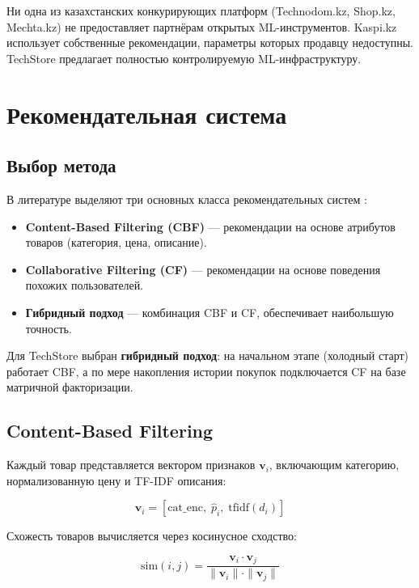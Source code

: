 \documentclass[14pt,a4paper]{extreport}
\begin{document}
Ни одна из казахстанских конкурирующих платформ (Technodom.kz, Shop.kz, Mechta.kz) не предоставляет партнёрам открытых ML-инструментов. Kaspi.kz использует собственные рекомендации, параметры которых продавцу недоступны. TechStore предлагает полностью контролируемую ML-инфраструктуру.

\section{Рекомендательная система}

\subsection{Выбор метода}

В литературе выделяют три основных класса рекомендательных систем \cite{koren2009}:

\begin{itemize}
  \item \textbf{Content-Based Filtering (CBF)} --- рекомендации на основе атрибутов товаров (категория, цена, описание).
  \item \textbf{Collaborative Filtering (CF)} --- рекомендации на основе поведения похожих пользователей.
  \item \textbf{Гибридный подход} --- комбинация CBF и CF, обеспечивает наибольшую точность.
\end{itemize}

Для TechStore выбран \textbf{гибридный подход}: на начальном этапе (холодный старт) работает CBF, а по мере накопления истории покупок подключается CF на базе матричной факторизации.

\subsection{Content-Based Filtering}

Каждый товар представляется вектором признаков $\mathbf{v}_i$, включающим категорию, нормализованную цену и TF-IDF описания:

\begin{equation}
  \mathbf{v}_i = [\text{cat\_enc}, \; \hat{p}_i, \; \text{tfidf}(d_i)]
\end{equation}

Схожесть товаров вычисляется через косинусное сходство:

\begin{equation}
  \text{sim}(i, j) = \frac{\mathbf{v}_i \cdot \mathbf{v}_j}{\|\mathbf{v}_i\| \cdot \|\mathbf{v}_j\|}
\end{equation}
\end{document}
